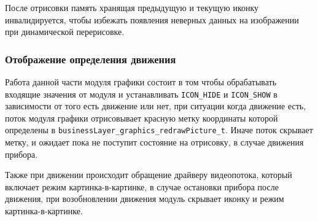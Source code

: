 После отрисовки память хранящая предыдущую и текущую иконку инвалидируется, чтобы избежать появления неверных данных на изображении при динамической перерисовке. 

\subsubsection{Отображение определения движения}

Работа данной части модуля графики состоит в том чтобы обрабатывать входящие значения от модуля \moduleMoveDetect и устанавливать \lstinline{ICON_HIDE} и \lstinline{ICON_SHOW}
в зависимости от того есть движение или нет, при ситуации когда движение есть, поток модуля графики отрисовывает красную метку координаты которой определены в \lstinline{businessLayer_graphics_redrawPicture_t}.
Иначе поток скрывает метку, и ожидает пока не поступит состояние на отрисовку, в случае движения прибора. 

Также при движении происходит обращение драйверу видеопотока,
который включает режим картинка-в-картинке, в случае остановки прибора после движения, при возобновлении движения модуль скрывает иконку и режим картинка-в-картинке.

